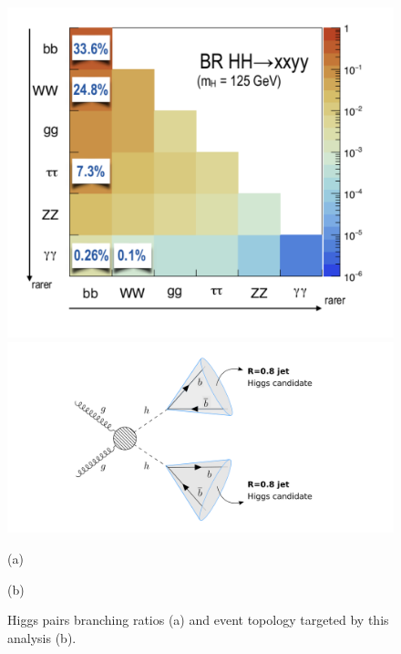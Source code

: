 \begin{figure}
	\centering
	\begin{minipage}{.45\textwidth}
		\centering
		\includegraphics[width=\linewidth]{./Figures/hhBR.png}
	\end{minipage}%
	\begin{minipage}{.55\textwidth}
		\centering
		\includegraphics[trim={4cm 0 5cm 0},clip,width=\linewidth]{./Figures/boosted1.png}
	\end{minipage}
	\begin{minipage}[t]{0.45\textwidth}
		\caption*{(a)}
	\end{minipage}%
	\hfill
	\begin{minipage}[t]{0.55\textwidth}
		\caption*{(b)}
	\end{minipage}
	\caption{Higgs pairs branching ratios (a) and event topology targeted by this analysis (b).}
	\label{fig:boosted}
\end{figure}

